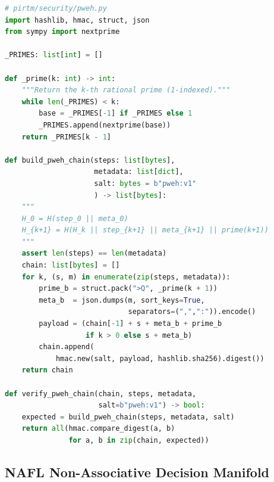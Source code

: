\documentclass[12pt,a4paper]{article}
\theoremstyle{definition}
\theoremstyle{plain}
\theoremstyle{remark}
\begin{document}
\begin{lstlisting}[language=Python, style=pythonstyle,
  caption={PWEH chain construction --- Eq.~(\ref{eq:pweh})},
  label={lst:pweh}]
# pirtm/security/pweh.py
import hashlib, hmac, struct, json
from sympy import nextprime

_PRIMES: list[int] = []

def _prime(k: int) -> int:
    """Return the k-th rational prime (1-indexed)."""
    while len(_PRIMES) < k:
        base = _PRIMES[-1] if _PRIMES else 1
        _PRIMES.append(nextprime(base))
    return _PRIMES[k - 1]

def build_pweh_chain(steps: list[bytes],
                     metadata: list[dict],
                     salt: bytes = b"pweh:v1"
                     ) -> list[bytes]:
    """
    H_0 = H(step_0 || meta_0)
    H_{k+1} = H(H_k || step_{k+1} || meta_{k+1} || prime(k+1))
    """
    assert len(steps) == len(metadata)
    chain: list[bytes] = []
    for k, (s, m) in enumerate(zip(steps, metadata)):
        prime_b = struct.pack(">Q", _prime(k + 1))
        meta_b  = json.dumps(m, sort_keys=True,
                             separators=(",",":")).encode()
        payload = (chain[-1] + s + meta_b + prime_b
                   if k > 0 else s + meta_b)
        chain.append(
            hmac.new(salt, payload, hashlib.sha256).digest())
    return chain

def verify_pweh_chain(chain, steps, metadata,
                      salt=b"pweh:v1") -> bool:
    expected = build_pweh_chain(steps, metadata, salt)
    return all(hmac.compare_digest(a, b)
               for a, b in zip(chain, expected))
\end{lstlisting}

\subsection{NAFL Non-Associative Decision Manifold}
\end{document}
